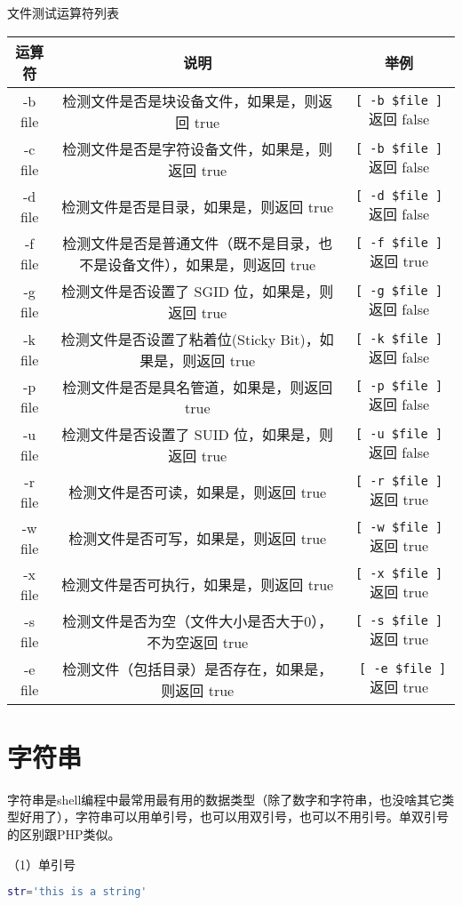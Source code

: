 文件测试运算符列表
{\tiny
\begin{center}
\begin{tabular}{c|c|c}
运算符&	说明	&举例\\
\hline
-b file	&检测文件是否是块设备文件，如果是，则返回 true&	\verb|[ -b $file ]| 返回 false\\
-c file	&检测文件是否是字符设备文件，如果是，则返回 true&	\verb|[ -b $file ]| 返回 false\\
-d file	&检测文件是否是目录，如果是，则返回 true&	\verb|[ -d $file ]| 返回 false\\
-f file	&检测文件是否是普通文件（既不是目录，也不是设备文件），如果是，则返回 true&	\verb|[ -f $file ]| 返回 true\\
-g file	&检测文件是否设置了 SGID 位，如果是，则返回 true&	\verb|[ -g $file ] |返回 false\\
-k file	&检测文件是否设置了粘着位(Sticky Bit)，如果是，则返回 true& \verb|[ -k $file ] |返回 false\\
-p file	&检测文件是否是具名管道，如果是，则返回 true&	\verb|[ -p $file ] |返回 false\\
-u file	&检测文件是否设置了 SUID 位，如果是，则返回 true&	\verb|[ -u $file ] |返回 false\\
-r file	&检测文件是否可读，如果是，则返回 true	& \verb|[ -r $file ]| 返回 true\\
-w file	&检测文件是否可写，如果是，则返回 true	& \verb|[ -w $file ]| 返回 true\\
-x file	&检测文件是否可执行，如果是，则返回 true&	 \verb|[ -x $file ]| 返回 true\\
-s file	&检测文件是否为空（文件大小是否大于0），不为空返回 true	& \verb|[ -s $file ]| 返回 true\\
-e file	&检测文件（包括目录）是否存在，如果是，则返回 true&	\verb| [ -e $file ]| 返回 true
\end{tabular}
\end{center}}


\section{字符串}
字符串是shell编程中最常用最有用的数据类型（除了数字和字符串，也没啥其它类型好用了），字符串可以用单引号，也可以用双引号，也可以不用引号。单双引号的区别跟PHP类似。

（1）单引号
\begin{lstlisting}[language=sh]
str='this is a string'
\end{lstlisting}

